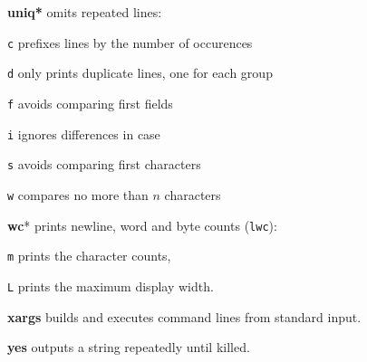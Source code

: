 \begin{enumx}
	\item [\cmd] \textbf{uniq*} omits repeated lines:
	\item [\texttt{c}] prefixes lines by the number of occurences
	\item [\texttt{d}] only prints duplicate lines, one for each group
	\item [\texttt{f}] avoids comparing first fields
	\item [\texttt{i}] ignores differences in case
	\item [\texttt{s}] avoids comparing first characters
	\item [\texttt{w}] compares no more than $n$ characters
\end{enumx}


\begin{enumx}
	\item [\cmd] \textbf{wc}* prints newline, word and byte counts (\texttt{lwc}):
	\item [\texttt{m}] prints the character counts,
	\item [\texttt{L}] prints the maximum display width.
\end{enumx}

\begin{enumx}
	\item [\cmd] \textbf{xargs} builds and executes command lines from standard input.
\end{enumx}

\begin{enumx}
	\item [\cmd] \textbf{yes} outputs a string repeatedly until killed.
\end{enumx}
